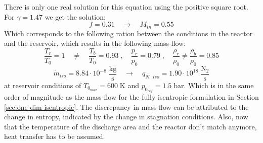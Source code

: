 	There is only one real solution for this equation using the positive square root.
	For $\gamma = 1.47$ we get the solution:
	$$
		f = 0.31
			\quad \to \quad
		M_{in} = 0.55
	$$
	Which corresponds to the following ration between the conditions in the reactor and the reservoir, which results in the following mass-flow:
	$$
		\frac{T_r}{T_0} = 1 \quad \neq \quad \frac{T_b}{T_0} = 0.93\;,
			\quad
		\frac{p_r}{p_0} = 0.79\;,
			\quad
		\frac{\rho_r}{\rho_0} \neq \frac{\rho_b}{\rho_0} = 0.85
	$$
	$$
		\dot{m}_{iso} = 8.84 \cdot 10^{-8} \; \frac{\text{kg}}{\text{s}}
			\quad \rightarrow \quad
		q_{N,\;iso} = 1.90 \cdot 10^{18} \; \frac{\text{N}_2}{\text{s}}
	$$
	at reservoir conditions of $T_{0_{max}} = 600\;\text{K}$ and $p_{0_{ref}} = 1.5\;\text{bar}$.
	Which is in the same order of magnitude as the mass-flow for the fully isentropic formulation in Section \ref{sec:one-dim-isentropic}.
	The discrepancy in mass-flow can be attributed to the change in entropy, indicated by the change in stagnation conditions.
	Also, now that the temperature of the discharge area and the reactor don't match anymore, heat transfer has to be assumed.

